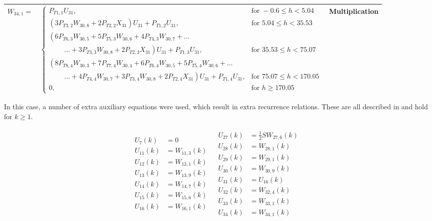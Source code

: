 \begin{longtable}{|p{1.5cm}|l|p{2cm}|}
$W_{34,1}=$ & $ 
\begin{cases}
P_{T 1,1}U_{31}, & \text{for } -0.6 \leq h < 5.04  \\
\left(3P_{T 3,2}W_{30,8}+2P_{T 2,2}X_{31}\right)U_{31}+P_{T 1,2}U_{31}, &  \text{for } 5.04\leq h < 35.53   \\
\left(6 P_{T 6,3}W_{30,5}+5P_{T 5,3}W_{30,6}+4P_{T 4,3}W_{30,7}+ \dots
\right. \\
\qquad\  \left. \dotsc +3P_{T 3,3}W_{30,8}+2P_{T 2,3}X_{31}\right)U_{31}+P_{T 1,3}U_{31}, &  \text{for } 35.53\leq h < 75.07   \\
\left(8 P_{T 8,4}W_{30,3}+7P_{T 7,4}W_{30,4}+6P_{T 6,4}W_{30,5}
+5P_{T 5,4}W_{30,6}+ \dots \right. \\
\qquad\  \left. \dotsc +4P_{T 4,4}W_{30,7}+3P_{T 3,4}W_{30,8}+2P_{T 2,4}X_{31}\right)U_{31}+P_{T 1,4}U_{31}, &  \text{for } 75.07\leq h < 170.05   \\
0, &  \text{for }  h \geq 170.05   
\end{cases}
 $ & Multiplication \\ \hline


\end{longtable}



\noindent
In this case, a number of extra auxiliary equations were used, which result in extra recurrence relations. These are all described in  and hold for $k\geq 1$.

\begin{align} \label{eq:allRecRel3}
\begin{split}
U_{7} \left(k\right)&=0 \\
U_{11}\left(k\right)&=W_{11,3}\left(k\right)\\
U_{12}\left(k\right)&=W_{12,1}\left(k\right)\\
U_{13}\left(k\right)&=W_{13,9}\left(k\right)\\
U_{14}\left(k\right)&=W_{14,7}\left(k\right)\\
U_{15}\left(k\right)&=W_{15,6}\left(k\right)\\
U_{16}\left(k\right)&=W_{16,1}\left(k\right)\\
\end{split}
&
\begin{split}
U_{27}\left(k\right)&=\frac{1}{2}SW_{27,6}\left(k\right)\\
U_{28}\left(k\right)&=W_{28,1}\left(k\right)\\
U_{29}\left(k\right)&=W_{29,1}\left(k\right)\\
U_{30}\left(k\right)&=W_{30,9}\left(k\right)\\
U_{31}\left(k\right)&=U_{16}\left(k\right)\\
U_{32}\left(k\right)&=W_{32,4}\left(k\right)\\
U_{33}\left(k\right)&=W_{33,1}\left(k\right)\\
U_{34}\left(k\right)&=W_{34,1}\left(k\right)\\
\end{split}
\end{align}




